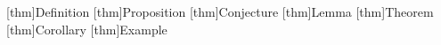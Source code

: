 \newtheorem{thm}{thm}[\majorcounter]

{
    \theoremstyle{blockmajor}
    \theoremheaderfont{\normalfont\bfseries}
    \theorembodyfont{\slshape}
    \theoremsymbol{}

    [thm]{Definition}
    [thm]{Proposition}
    [thm]{Conjecture}
    [thm]{Lemma}
    [thm]{Theorem}
    [thm]{Corollary}
    [thm]{Example}
}
